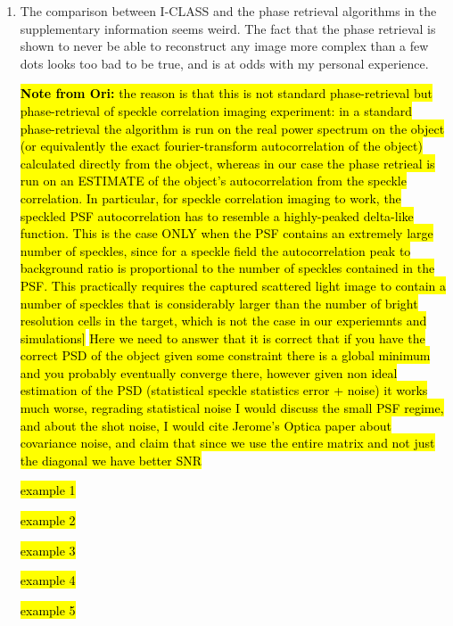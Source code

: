 \documentclass[12pt]{article}
\newcommand{\hlgreen}[1]{\sethlcolor{green!30}\hl{#1}}
\newcommand{\hlred}[1]{\sethlcolor{red!30}\hl{#1}}
\newcommand{\hlyellow}[1]{\sethlcolor{yellow!50}\hl{#1}}
\newcommand{\hlblue}[1]{\sethlcolor{blue!20}\hl{#1}}
\newenvironment{reviewercomment}
    {\begin{tcolorbox}[width=\linewidth,colback=gray!5,colframe=commentcolor!50,title=Reviewer Comment,left=5pt,right=5pt]}
    {\end{tcolorbox}}
\newenvironment{ourresponse}
    {\begin{tcolorbox}[width=\linewidth,breakable,enhanced,colback=gray!5,colframe=responsecolor!50,title=Response,left=5pt,right=5pt]}
    {\end{tcolorbox}}
\begin{document}
\begin{enumerate}[label=\arabic*.]
\begin{enumerate}[label=3.\alph*.]
        \item \leavevmode\vspace{-\baselineskip}
        \begin{reviewercomment}
            The comparison between I-CLASS and the phase retrieval algorithms in the supplementary information seems weird. The fact that the phase retrieval is shown to never be able to reconstruct any image more complex than a few dots looks too bad to be true, and is at odds with my personal experience.
        \end{reviewercomment}
        \begin{ourresponse}
            \hlyellow{\textbf{Note from Ori:}
            the reason is that this is not standard phase-retrieval but phase-retrieval of speckle correlation imaging experiment: in a standard phase-retrieval the algorithm is run on the real power spectrum on the object (or equivalently the exact fourier-transform autocorrelation of the object) calculated directly from the object, whereas in our case the phase retrieal is run on an ESTIMATE of the object’s autocorrelation from the speckle correlation. In particular, for speckle correlation imaging to work, the speckled PSF autocorrelation has to resemble a highly-peaked delta-like function. This is the case ONLY when the PSF contains an extremely large number of speckles, since for a speckle field the autocorrelation peak to background ratio is proportional to the number of speckles contained in the PSF. This practically requires the captured scattered light image to contain a number of speckles that is considerably larger than the number of bright resolution cells in the target, which is not the case in our experiemnts and simulations]}
        \hlred{Here we need to answer that it is correct that if you have the correct PSD of the object given some constraint there is a global minimum and you probably eventually converge there, however given non ideal estimation of the PSD (statistical speckle statistics error + noise) it works much worse, regrading statistical noise I would discuss the small PSF regime, and about the shot noise, I would cite Jerome's Optica paper about covariance noise, and claim that since we use the entire matrix and not just the diagonal we have better SNR}
            
            
        \end{ourresponse}
        \hl{example 1}
        
        \hlblue{example 2}
        
        \hlgreen{example 3}
        
        \hlred{example 4}
        
        \hlyellow{example 5}
        
    \end{enumerate}
\end{enumerate}
\end{document}
